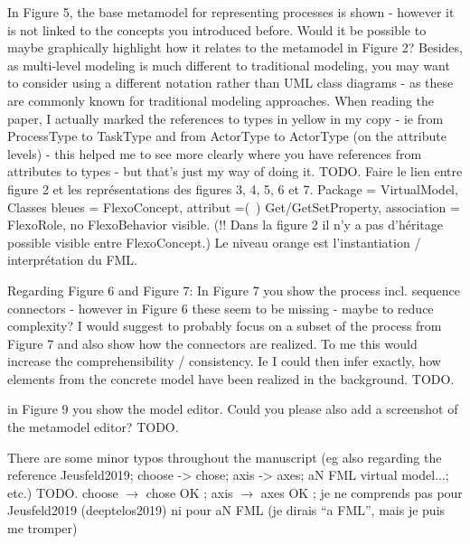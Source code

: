 \documentclass[10pt]{article}
\begin{document}
\begin{response}{In Figure 5, the base metamodel for representing processes is shown - however it is not linked to the concepts you introduced before. Would it be possible to maybe graphically highlight how it relates to the metamodel in Figure 2? Besides, as multi-level modeling is much different to traditional modeling, you may want to consider using a different notation rather than UML class diagrams - as these are commonly known for traditional modeling approaches. When reading the paper, I actually marked the references to types in yellow in my copy - ie from ProcessType to TaskType and from ActorType to ActorType (on the attribute levels) - this helped me to see more clearly where you have references from attributes to types - but that's just my way of doing it.} 
TODO. Faire le lien entre figure 2 et les représentations des figures 3, 4, 5, 6 et 7. Package = VirtualModel, Classes bleues = FlexoConcept, attribut =(~) Get/GetSetProperty, association = FlexoRole, no FlexoBehavior visible. (!! Dans la figure 2 il n'y a pas d'héritage possible visible entre FlexoConcept.) Le niveau orange est l'instantiation / interprétation du FML.
\end{response}

\begin{response}{Regarding Figure 6 and Figure 7: In Figure 7 you show the process incl. sequence connectors - however in Figure 6 these seem to be missing - maybe to reduce complexity? I would suggest to probably focus on a subset of the process from Figure 7 and also show how the connectors are realized. To me this would increase the comprehensibility / consistency. Ie I could then infer exactly, how elements from the concrete model have been realized in the background.} 
TODO.
\end{response}

\begin{response}{in Figure 9 you show the model editor. Could you please also add a screenshot of the metamodel editor?} 
TODO.
\end{response}

\begin{response}{There are some minor typos throughout the manuscript (eg also regarding the reference Jeusfeld2019; choose -> chose; axis -> axes; aN FML virtual model...; etc.)} 
TODO.
choose $\rightarrow$ chose OK ; axis $\rightarrow$  axes OK ; je ne comprends pas pour Jeusfeld2019
(deeptelos2019) ni pour aN FML (je dirais ``a FML'', mais je puis me tromper)
\end{response}
\end{document}
